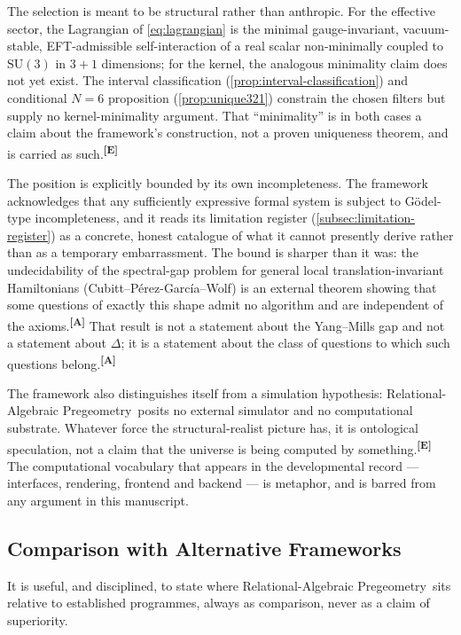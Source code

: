 \documentclass[12pt,a4paper,twoside]{article}
\theoremstyle{plain}
\theoremstyle{definition}
\theoremstyle{remark}
\newcommand{\ProjectShort}{Relational-Algebraic Pregeometry}
\newcommand{\RAP}{\ProjectShort}
\newcommand{\catmark}[1]{\textsuperscript{\textsf{\textbf{[#1]}}}}
\begin{document}
\noindent The selection is meant to be structural rather than anthropic.
For the effective sector, the Lagrangian of \cref{eq:lagrangian} is the
minimal gauge-invariant, vacuum-stable, EFT-admissible self-interaction
of a real scalar non-minimally coupled to $\mathrm{SU}(3)$ in $3+1$
dimensions; for the kernel, the analogous minimality claim does not yet
exist. The interval classification (\cref{prop:interval-classification})
and conditional $N=6$ proposition (\cref{prop:unique321}) constrain the
chosen filters but supply no kernel-minimality argument. That ``minimality'' is in both cases a claim about the
framework's construction, not a proven uniqueness theorem, and is carried
as such.\catmark{E}

The position is explicitly bounded by its own incompleteness. The
framework acknowledges that any sufficiently expressive formal system is
subject to G\"odel-type incompleteness, and it reads its limitation
register (\cref{subsec:limitation-register}) as a concrete, honest
catalogue of what it cannot presently derive rather than as a temporary
embarrassment. The bound is sharper than it was: the undecidability of
the spectral-gap problem for general local translation-invariant
Hamiltonians (Cubitt--P\'erez-Garc\'ia--Wolf) is an external theorem
showing that some questions of exactly this shape admit no algorithm and
are independent of the axioms.\catmark{A} That result is not a statement
about the Yang--Mills gap and not a statement about $\Delta$; it is a
statement about the class of questions to which such questions
belong.\catmark{A}

The framework also distinguishes itself from a simulation hypothesis:
\RAP\ posits no external simulator and no computational substrate.
Whatever force the structural-realist picture has, it is ontological
speculation, not a claim that the universe is being computed by
something.\catmark{E} The computational vocabulary that appears in the
developmental record --- interfaces, rendering, frontend and backend ---
is metaphor, and is barred from any argument in this manuscript.

\subsection{Comparison with Alternative Frameworks}
\label{subsec:alt-frameworks}

It is useful, and disciplined, to state where \RAP\ sits relative to
established programmes, always as comparison, never as a claim of
superiority.
\end{document}
